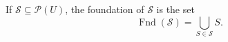 If $\mathcal{S} \subseteq \mathcal{P}(U)$, the foundation of $\mathcal{S}$ is the set
$$\operatorname{Fnd}(\mathcal{S}) = \bigcup_{S \in \mathcal{S}} S.$$
